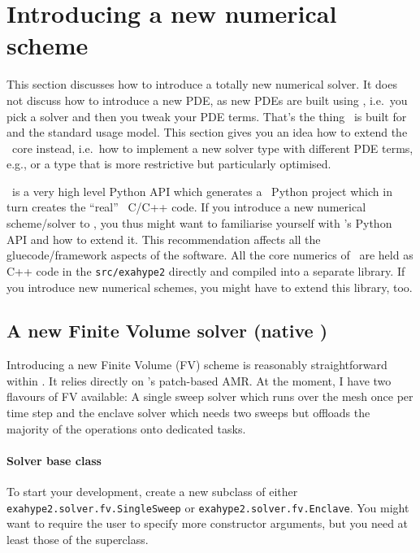 \section{Introducing a new numerical scheme}

This section discusses how to introduce a totally new numerical solver. 
It does not discuss how to introduce a new PDE, as new PDEs are built using
\ExaHyPE, i.e.~you pick a solver and then you tweak your PDE terms. 
That's the thing \ExaHyPE\ is built for and the standard usage model.
This section gives you an idea how to extend the \ExaHyPE\ core instead,
i.e.~how to implement a new solver type with different PDE terms, e.g., or a
type that is more restrictive but particularly optimised.

\begin{remark}
  \ExaHyPE\ is a very high level Python API which generates a \Peano\
   Python project which in turn creates the ``real'' \Peano\ C/C++ code. If you
   introduce a new numerical scheme/solver to \ExaHyPE, you thus might want to
   familiarise yourself with \Peano's Python API and how to extend it. This
   recommendation affects all the gluecode/framework aspects of the software.
   All the core numerics of \ExaHyPE\ are held as C++ code in the
   \texttt{src/exahype2} directly and compiled into a separate library. If you
   introduce new numerical schemes, you might have to extend this library, too.
\end{remark}



\subsection{A new Finite Volume solver (native \ExaHyPE)}

Introducing a new Finite Volume (FV) scheme is reasonably straightforward within
\ExaHyPE.
It relies directly on \Peano's patch-based AMR.
At the moment, I have two flavours of FV available: A single sweep solver which
runs over the mesh once per time step and the enclave solver which needs two
sweeps but offloads the majority of the operations onto dedicated tasks.


\paragraph{Solver base class}

To start your development, create a new subclass of either \linebreak
\texttt{exahype2.solver.fv.SingleSweep} or \texttt{exahype2.solver.fv.Enclave}.
You might want to require the user to specify more constructor arguments, but 
you need at least those of the superclass.




